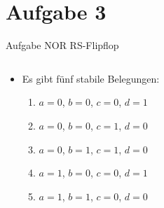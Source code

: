 
\section{Aufgabe 3}

\setcounter{exercise}{1}

\begin{frame}{Aufgabe \thesection}{NOR RS-Flipflop}
  \begin{solutionnoinc}
    \begin{columns}
      \begin{column}{0.5\textwidth}
        \begin{itemize}
          \item Es gibt \alert{fünf stabile Belegungen}:
          \begin{enumerate} 
            \item { $a = 0$, $b = 0$, $c = 0$, $d = 1$}
            \item { $a = 0$, $b = 0$, $c = 1$, $d = 0$}
            \item { $a = 0$, $b = 1$, $c = 1$, $d = 0$}
            \item { $a = 1$, $b = 0$, $c = 0$, $d = 1$}
            \item { $a = 1$, $b = 1$, $c = 0$, $d = 0$}
          \end{enumerate}
        \end{itemize}
      \end{column}
      \begin{column}{0.5\textwidth}

\end{column}
\end{columns}
\end{solutionnoinc}
\end{frame}
